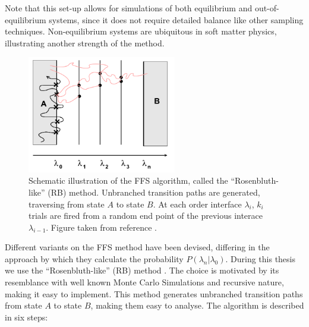 Note that this set-up allows for simulations of both equilibrium and out-of-equilibrium
systems, since it does not require detailed balance like other sampling techniques.
Non-equilibrium systems are ubiquitous in soft matter physics, illustrating another
strength of the method.
\begin{figure}[ht]
\begin{center}
  \includegraphics[width=0.58\textwidth]{Figures/FFS.png}
  \caption[Schematic illustration of the “Rosenbluth-like” (RB) method]{{\small Schematic
illustration of the FFS algorithm, called the “Rosenbluth-like” (RB) method. Unbranched
transition paths are generated, traversing from state $A$ to state $B$. At each order
interface $\lambda_i$, $k_i$ trials are fired from a random end point of the previous
interace $\lambda_{i-1}$. Figure taken from reference \cite{Allen2009}.}}
\end{center}
\end{figure}

Different variants on the FFS method have been devised, differing in the approach by
which they calculate the probability $P(\lambda_n|\lambda_0)$. During this thesis we use
the “Rosenbluth-like” (RB) method \cite{Allen2009}. The choice
is motivated by its resemblance with well known Monte Carlo Simulations and recursive
nature, making it easy to implement.  This method generates unbranched transition paths
from state $A$ to state $B$, making them easy to analyse. The algorithm is described in
six steps:

